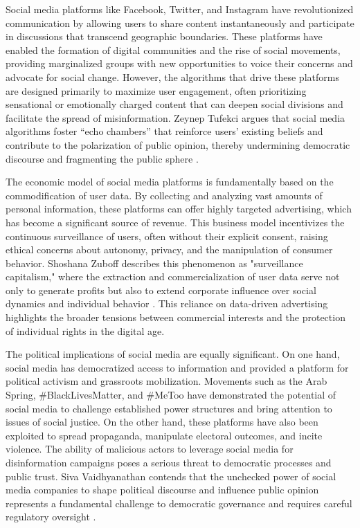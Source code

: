 \begin{refsection}
Social media platforms like Facebook, Twitter, and Instagram have revolutionized communication by allowing users to share content instantaneously and participate in discussions that transcend geographic boundaries. These platforms have enabled the formation of digital communities and the rise of social movements, providing marginalized groups with new opportunities to voice their concerns and advocate for social change. However, the algorithms that drive these platforms are designed primarily to maximize user engagement, often prioritizing sensational or emotionally charged content that can deepen social divisions and facilitate the spread of misinformation. Zeynep Tufekci argues that social media algorithms foster “echo chambers” that reinforce users' existing beliefs and contribute to the polarization of public opinion, thereby undermining democratic discourse and fragmenting the public sphere \cite[pp.~154-157]{tufekci2021twitter}.

The economic model of social media platforms is fundamentally based on the commodification of user data. By collecting and analyzing vast amounts of personal information, these platforms can offer highly targeted advertising, which has become a significant source of revenue. This business model incentivizes the continuous surveillance of users, often without their explicit consent, raising ethical concerns about autonomy, privacy, and the manipulation of consumer behavior. Shoshana Zuboff describes this phenomenon as "surveillance capitalism," where the extraction and commercialization of user data serve not only to generate profits but also to extend corporate influence over social dynamics and individual behavior \cite[pp.~320-323]{zuboff2020age}. This reliance on data-driven advertising highlights the broader tensions between commercial interests and the protection of individual rights in the digital age.

The political implications of social media are equally significant. On one hand, social media has democratized access to information and provided a platform for political activism and grassroots mobilization. Movements such as the Arab Spring, \#BlackLivesMatter, and \#MeToo have demonstrated the potential of social media to challenge established power structures and bring attention to issues of social justice. On the other hand, these platforms have also been exploited to spread propaganda, manipulate electoral outcomes, and incite violence. The ability of malicious actors to leverage social media for disinformation campaigns poses a serious threat to democratic processes and public trust. Siva Vaidhyanathan contends that the unchecked power of social media companies to shape political discourse and influence public opinion represents a fundamental challenge to democratic governance and requires careful regulatory oversight \cite[pp.~105-108]{vaidhyanathan2019antisocial}.


\end{refsection}
